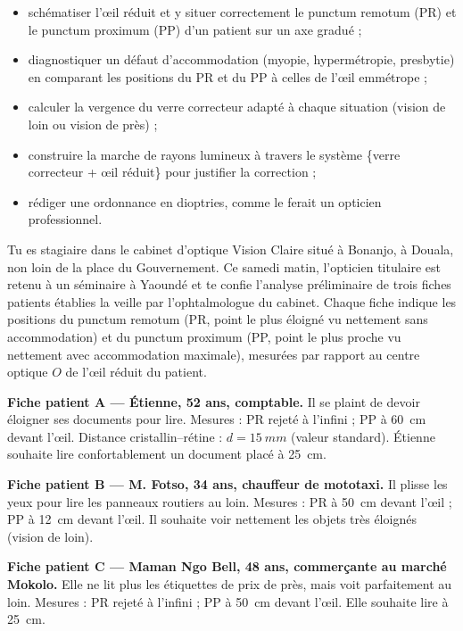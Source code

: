 \documentclass[11pt]{article}
\newcommand{\cle}[1]{{\popxbold\color{popdark}#1}}
\newcounter{popsec}
\newcounter{popsub}
\newcommand{\courssub}[1]{%
  \stepcounter{popsub}%
  \par\vspace{9pt}\noindent{\popxbold\fontsize{11.5}{13}\selectfont\color{popink}{\color{poporange}\thepopsec.\thepopsub}\hspace{6pt}#1}\par\nopagebreak\vspace{4pt}
}
\begin{document}
\begin{itemize}
\item schématiser l'\cle{œil réduit} et y situer correctement le \cle{punctum remotum} (PR) et le \cle{punctum proximum} (PP) d'un patient sur un axe gradué ;
\item \cle{diagnostiquer} un défaut d'accommodation (myopie, hypermétropie, presbytie) en comparant les positions du PR et du PP à celles de l'œil emmétrope ;
\item calculer la \cle{vergence} du verre correcteur adapté à chaque situation (vision de loin ou vision de près) ;
\item construire la marche de rayons lumineux à travers le système \{verre correcteur + œil réduit\} pour justifier la correction ;
\item rédiger une \og ordonnance \fg{} en dioptries, comme le ferait un opticien professionnel.
\end{itemize}

\courssub{Situation}

Tu es stagiaire dans le cabinet d'optique \og Vision Claire \fg{} situé à Bonanjo, à Douala, non loin de la place du Gouvernement. Ce samedi matin, l'opticien titulaire est retenu à un séminaire à Yaoundé et te confie l'analyse préliminaire de trois fiches patients établies la veille par l'ophtalmologue du cabinet. Chaque fiche indique les positions du punctum remotum (PR, point le plus éloigné vu nettement sans accommodation) et du punctum proximum (PP, point le plus proche vu nettement avec accommodation maximale), mesurées par rapport au centre optique $O$ de l'œil réduit du patient.

\textbf{Fiche patient A — Étienne, 52 ans, comptable.} Il se plaint de devoir éloigner ses documents pour lire. Mesures : PR rejeté à l'infini ; PP à \SI{60}{cm} devant l'œil. Distance cristallin--rétine : $d = \SI{15}{mm}$ (valeur standard). Étienne souhaite lire confortablement un document placé à \SI{25}{cm}.

\textbf{Fiche patient B — M. Fotso, 34 ans, chauffeur de mototaxi.} Il plisse les yeux pour lire les panneaux routiers au loin. Mesures : PR à \SI{50}{cm} devant l'œil ; PP à \SI{12}{cm} devant l'œil. Il souhaite voir nettement les objets très éloignés (vision de loin).

\textbf{Fiche patient C — Maman Ngo Bell, 48 ans, commerçante au marché Mokolo.} Elle ne lit plus les étiquettes de prix de près, mais voit parfaitement au loin. Mesures : PR rejeté à l'infini ; PP à \SI{50}{cm} devant l'œil. Elle souhaite lire à \SI{25}{cm}.
\end{document}
